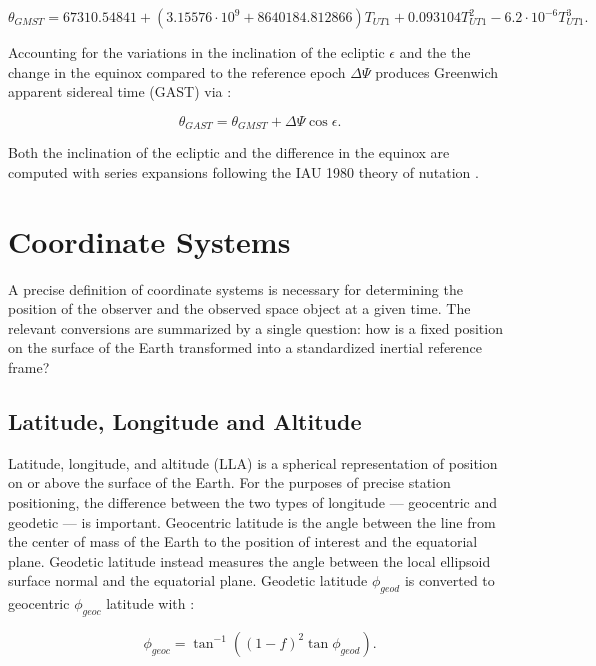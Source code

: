\begin{equation} \label{eq:date_to_gmst}
  \theta_{GMST} = 67310.54841
        + \left(3.15576 \cdot 10^9 + 8640184.812866 \right) T_{UT1}
        + 0.093104 T_{UT1}^2
        - 6.2 \cdot 10^{-6} T_{UT1}^3.
\end{equation}

Accounting for the variations in the inclination of the ecliptic $\epsilon$ and the the change in the equinox compared to the reference epoch $\Delta \Psi$ produces Greenwich apparent sidereal time (GAST) via \cite{frueh2019notes}:

\begin{equation} \label{eq:date_to_gast}
  \theta_{GAST} = \theta_{GMST} + \Delta \Psi \cos\epsilon.
\end{equation}

Both the inclination of the ecliptic and the difference in the equinox are computed with series expansions following the IAU 1980 theory of nutation \cite{vallado4ed}.

\section{Coordinate Systems}

A precise definition of coordinate systems is necessary for determining the position of the observer and the observed space object at a given time. The relevant conversions are summarized by a single question: how is a fixed position on the surface of the Earth transformed into a standardized inertial reference frame?

\subsection{Latitude, Longitude and Altitude}

Latitude, longitude, and altitude (LLA) is a spherical representation of position on or above the surface of the Earth. For the purposes of precise station positioning, the difference between the two types of longitude --- geocentric and geodetic --- is important. Geocentric latitude is the angle between the line from the center of mass of the Earth to the position of interest and the equatorial plane. Geodetic latitude instead measures the angle between the local ellipsoid surface normal and the equatorial plane. Geodetic latitude $\phi_{geod}$ is converted to geocentric $\phi_{geoc}$ latitude with \cite{frueh2019notes}:

\begin{equation} \label{eq:geod_to_geoc}
  \phi_{geoc} = \tan^{-1} \left((1 - f)^2 \tan\phi_{geod} \right).
\end{equation}

